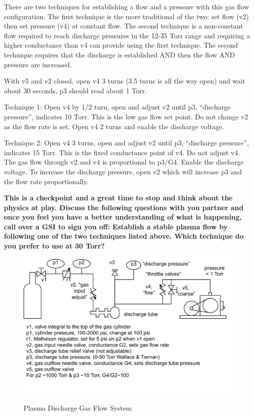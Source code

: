 \documentclass{../lab}
\begin{document}
There are two techniques for establishing a flow and a pressure with this gas flow configuration. The first technique is the more traditional of the two: set flow (v2) then set pressure (v4) at constant flow. The second technique is a non-constant flow required to reach discharge pressures in the 12-35 Torr range and requiring a higher conductance than v4 can provide using the first technique. The second technique requires that the discharge is established AND then the flow AND pressure are increased.

With v5 and v2 closed, open v4 3 turns (3.5 turns is all the way open) and wait about 30 seconds, p3 should read about 1 Torr.

Technique 1: Open v4 by 1/2 turn, open and adjust v2 until p3, ``discharge pressure'', indicates 10 Torr. This is the low gas flow set point. Do not change v2 as the flow rate is set. Open v4 2 turns and enable the discharge voltage.

Technique 2: Open v4 3 turns, open and adjust v2 until p3, ``discharge pressure'', indicates 15 Torr. This is the fixed conductance point of v4. Do not adjust v4. The gas flow through v2 and v4 is proportional to p3/G4. Enable the discharge voltage. To increase the discharge pressure, open v2 which will increase p3 and the flow rate proportionally.

\textbf{This is a checkpoint and a great time to stop and think about the physics at play. Discuss the following questions with you partner and once you feel you have a better understanding of what is happening, call over a GSI to sign you off:
Establish a stable plasma flow by following one of the two techniques listed above. Which technique do you prefer to use at 30 Torr?}

\begin{figure}[h]
    \centering
    \href{http://experimentationlab.berkeley.edu/sites/default/files/images/680px-Hall_diagram.png}{\includegraphics[width=0.75\linewidth]{images/680px-Hall_diagram.png}}
    \caption{Plasma Discharge Gas Flow System}
    \label{fig:680px-Hall_diagram}
\end{figure}
\end{document}
